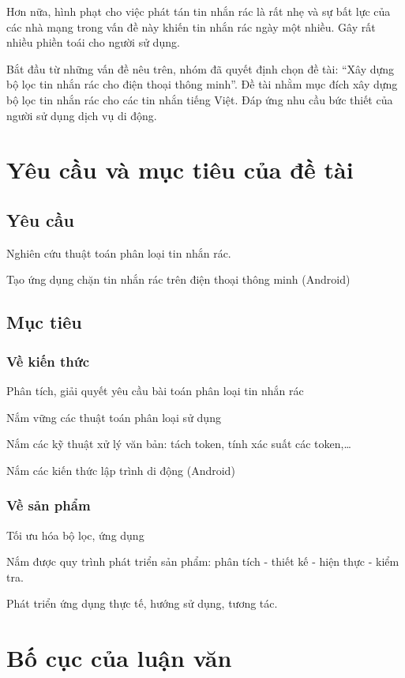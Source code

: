 Hơn nữa, hình phạt cho việc phát tán tin nhắn rác là rất nhẹ và sự bất lực của các nhà mạng trong vấn đề này khiến tin nhắn rác ngày một nhiều. Gây rất nhiều phiền toái cho người sử dụng.

Bắt đầu từ những vấn đề nêu trên, nhóm đã quyết định chọn đề tài: “Xây dựng bộ lọc tin nhắn rác cho điện thoại thông minh”. Đề tài nhằm mục đích xây dựng bộ lọc tin nhắn rác cho các tin nhắn tiếng Việt. Đáp ứng nhu cầu bức thiết của người sử dụng dịch vụ di động.

\section{Yêu cầu và mục tiêu của đề tài}

\subsection{Yêu cầu}

Nghiên cứu thuật toán phân loại tin nhắn rác.

Tạo ứng dụng chặn tin nhắn rác trên điện thoại thông minh (Android)

\subsection{Mục tiêu}

\subsubsection{Về kiến thức}

Phân tích, giải quyết yêu cầu bài toán phân loại tin nhắn rác

Nắm vững các thuật toán phân loại sử dụng

Nắm các kỹ thuật xử lý văn bản: tách token, tính xác suất các token,\ldots

Nắm các kiến thức lập trình di động (Android)

\subsubsection{Về sản phẩm}

Tối ưu hóa bộ lọc, ứng dụng

Nắm được quy trình phát triển sản phẩm: phân tích - thiết kế - hiện thực - kiểm tra.

Phát triển ứng dụng thực tế, hướng sử dụng, tương tác.

\section{Bố cục của luận văn}



